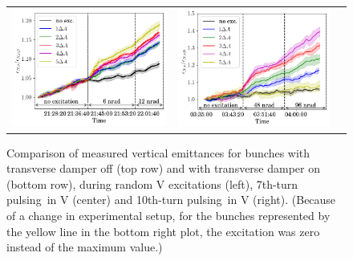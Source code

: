 \documentclass[
prstab
,reprint
,linenumbers
,longbibliography
,preprintnumbers
,showkeys
,amsfonts,amssymb,amsmath
,floatfix
]{revtex4-1}
\newcommand{\seventhtp}{7th-turn pulsing}
\newcommand{\tenthtp}{10th-turn pulsing}
\newlength{\thirdwidth}
\begin{document}
\begin{figure}
\begin{tabular}{ccc}
    \includegraphics[width=\thirdwidth]{2017_emitv_avg_rel_v7th_with_damper_no_text.png} &
    \includegraphics[width=\thirdwidth]{2016_emitv_avg_rel_v10th_with_damper_no_text.png} \\
    \end{tabular}
    \caption{Comparison of measured vertical emittances for bunches
      with transverse damper off (top row) and with transverse damper
      on (bottom row), during random V excitations (left), \seventhtp\
      in V (center) and \tenthtp\ in V (right). (Because of a change
      in experimental setup, for the bunches represented by the yellow
      line in the bottom right plot, the excitation was zero instead
      of the maximum value.)}
    \label{fig:damp}
\end{figure}
\end{document}
